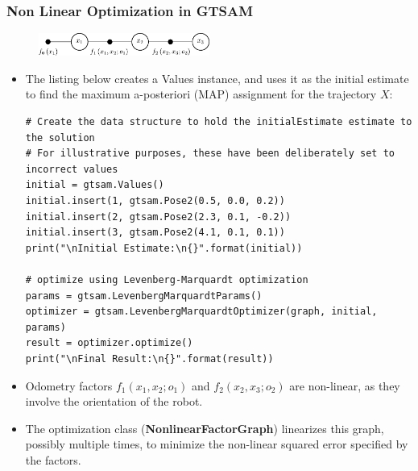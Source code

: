 \begin{frame}[fragile]
    \frametitle{Non Linear Optimization in GTSAM}

    \scriptsize

    \begin{figure}[!h]
        \includegraphics[width=0.5\textwidth]{./images/gtsam/factor_graph_odometry.pdf}
    \end{figure}

    \begin{itemize}
        \item  The listing below creates a Values instance, and uses it as the initial estimate to find the maximum a-posteriori (MAP) assignment for the trajectory $X$:
    
\begin{lstlisting}[style=python] 
# Create the data structure to hold the initialEstimate estimate to the solution
# For illustrative purposes, these have been deliberately set to incorrect values
initial = gtsam.Values()
initial.insert(1, gtsam.Pose2(0.5, 0.0, 0.2))
initial.insert(2, gtsam.Pose2(2.3, 0.1, -0.2))
initial.insert(3, gtsam.Pose2(4.1, 0.1, 0.1))
print("\nInitial Estimate:\n{}".format(initial))

# optimize using Levenberg-Marquardt optimization
params = gtsam.LevenbergMarquardtParams()
optimizer = gtsam.LevenbergMarquardtOptimizer(graph, initial, params)
result = optimizer.optimize()
print("\nFinal Result:\n{}".format(result))
\end{lstlisting}
        
        \item Odometry factors $f_{1}(x_1, x_2; o_1)$ and $f_{2}(x_2, x_3; o_2)$ are non-linear, as they involve the orientation of the robot.
        \item The optimization class (\textbf{NonlinearFactorGraph}) linearizes this graph, possibly multiple times, to minimize the non-linear squared error specified by the factors.
    \end{itemize}

\end{frame}

